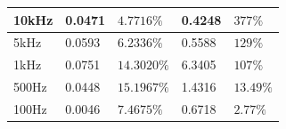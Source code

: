 \documentclass{article}
\begin{document}
\begin{table}[H]
\begin{tabular}{|l|l|l|l|l|}
		10kHz     & 0.0471                                                                                  & $4.7716\%$                                                                                         & 0.4248                                                                                          & $377\%$                                                                                            \\ \hline
		5kHz      & 0.0593                                                                                  & $6.2336\%$                                                                                         & 0.5588                                                                                          & $129\%$                                                                                            \\ \hline
		1kHz      & 0.0751                                                                                  & $14.3020\%$                                                                                        & 6.3405                                                                                          & $107\%$                                                                                            \\ \hline
		500Hz     & 0.0448                                                                                  & $15.1967\%$                                                                                        & 1.4316                                                                                          & $13.49\%$                                                                                          \\ \hline
		100Hz     & 0.0046                                                                                  & $7.4675\%$                                                                                         & 0.6718                                                                                          & $2.77\%$                                                                                           \\ \hline
	\end{tabular}
\end{table}
\end{document}
